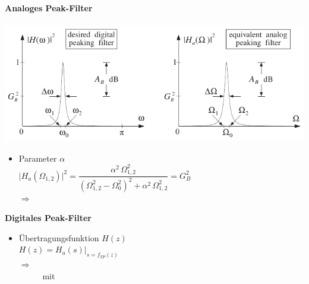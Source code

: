 	\begin{minipage}{0.045\textwidth}
		\begin{tabular}{c|c}
			\\[19.6cm]
		\end{tabular}
	\end{minipage}
	\begin{minipage}{0.48\textwidth}
		\textbf{\large{Analoges Peak-Filter}}\\[0.2cm]
		\\[0.2cm]
		\includegraphics[width = \textwidth]{pic/Preak2ordnung.pdf}\\[-0.5cm]
		\begin{itemize}
		 \item Parameter $\alpha$\\[0.1cm]
		 $\big|H_a(\Omega_{1,2})\big|^2 = \dfrac{\alpha^2\,\Omega_{1,2}^2}{(\Omega_{1,2}^2-\Omega_0^2)^2+\alpha^2\,\Omega_{1,2}^2} = G_B^2$\\[0.2cm]
		 $\Rightarrow\quad\;$\\[0.25cm]
		\end{itemize}
		\textbf{\large{Digitales Peak-Filter}}\\[-0.3cm]
		\begin{itemize}
		 \item Übertragungsfunktion $H(z)$\\[0.1cm]
		 $H(z) = H_a(s)\Big|_{s=f_{TP}(z)}$\\[0.2cm]
		 $\Rightarrow\quad$$\quad$\\[0.2cm]
		 \textcolor{white}{$\Rightarrow\quad\;$}mit$\quad$\\[0.1cm]

\end{itemize}
\end{minipage}
